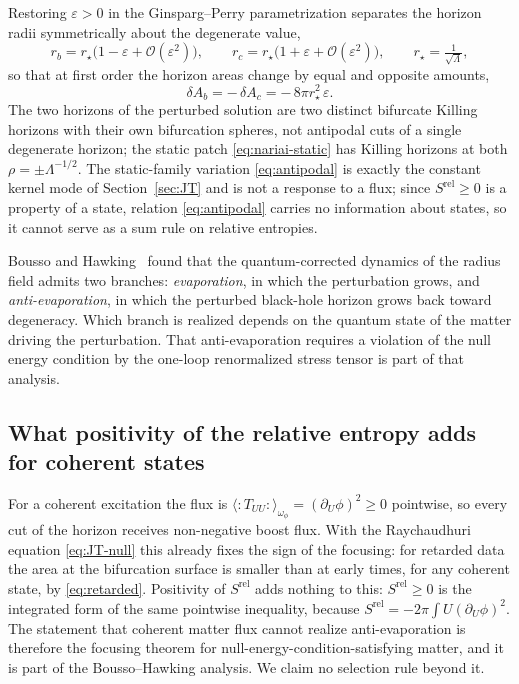 \documentclass[11pt]{article}
\newcommand{\Srel}{S^{\mathrm{rel}}}
\begin{document}
Restoring $\varepsilon > 0$ in the Ginsparg--Perry parametrization separates the horizon radii symmetrically about the degenerate value,
\begin{equation}
r_b = r_\star\big(1 - \varepsilon + \mathcal{O}(\varepsilon^2)\big),
\qquad
r_c = r_\star\big(1 + \varepsilon + \mathcal{O}(\varepsilon^2)\big),
\qquad r_\star = \tfrac{1}{\sqrt{\Lambda}},
\label{eq:split}
\end{equation}
so that at first order the horizon areas change by equal and opposite amounts,
\begin{equation}
\delta A_b = -\,\delta A_c = -\,8\pi r_\star^2\, \varepsilon .
\label{eq:antipodal}
\end{equation}
The two horizons of the perturbed solution are two distinct bifurcate Killing horizons with their own bifurcation spheres, not antipodal cuts of a single degenerate horizon; the static patch \eqref{eq:nariai-static} has Killing horizons at both $\rho=\pm\Lambda^{-1/2}$. The static-family variation \eqref{eq:antipodal} is exactly the constant kernel mode of Section~\ref{sec:JT} and is not a response to a flux; since $\Srel\ge0$ is a property of a state, relation \eqref{eq:antipodal} carries no information about states, so it cannot serve as a sum rule on relative entropies.

Bousso and Hawking~\cite{BoussoHawking} found that the quantum-corrected dynamics of the radius field admits two branches: \emph{evaporation}, in which the perturbation grows, and \emph{anti-evaporation}, in which the perturbed black-hole horizon grows back toward degeneracy. Which branch is realized depends on the quantum state of the matter driving the perturbation. That anti-evaporation requires a violation of the null energy condition by the one-loop renormalized stress tensor is part of that analysis.

\subsection{What positivity of the relative entropy adds for coherent states}

For a coherent excitation the flux is $\langle{:}T_{UU}{:}\rangle_{\omega_\phi}=(\partial_U\phi)^2\ge0$ pointwise, so every cut of the horizon receives non-negative boost flux. With the Raychaudhuri equation \eqref{eq:JT-null} this already fixes the sign of the focusing: for retarded data the area at the bifurcation surface is smaller than at early times, for any coherent state, by \eqref{eq:retarded}. Positivity of $\Srel$ adds nothing to this: $\Srel\ge0$ is the integrated form of the same pointwise inequality, because $\Srel=-2\pi\int U(\partial_U\phi)^2$. The statement that coherent matter flux cannot realize anti-evaporation is therefore the focusing theorem for null-energy-condition-satisfying matter, and it is part of the Bousso--Hawking analysis. We claim no selection rule beyond it.
\end{document}

